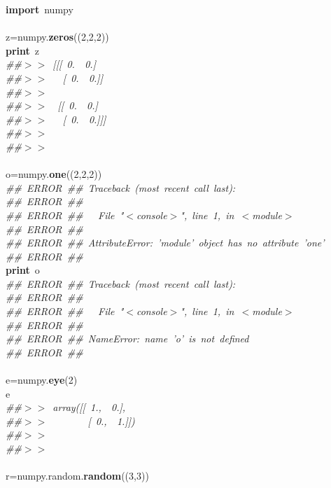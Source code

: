 \noindent
\mbox{}\textbf{import}\ numpy \\
\mbox{} \\
\mbox{}z=numpy.\textbf{zeros}((2,2,2)) \\
\mbox{}\textbf{print}\ z \\
\mbox{}\textit{\#\#$>$$>$\ [[[\ 0.\ \ 0.]} \\
\mbox{}\textit{\#\#$>$$>$\ \ \ [\ 0.\ \ 0.]]} \\
\mbox{}\textit{\#\#$>$$>$\ } \\
\mbox{}\textit{\#\#$>$$>$\ \ [[\ 0.\ \ 0.]} \\
\mbox{}\textit{\#\#$>$$>$\ \ \ [\ 0.\ \ 0.]]]} \\
\mbox{}\textit{\#\#$>$$>$\ } \\
\mbox{}\textit{\#\#$>$$>$\ } \\
\mbox{} \\
\mbox{}o=numpy.\textbf{one}((2,2,2)) \\
\mbox{}\textit{\#\#\ ERROR\ \#\#\ Traceback\ (most\ recent\ call\ last):} \\
\mbox{}\textit{\#\#\ ERROR\ \#\#\ } \\
\mbox{}\textit{\#\#\ ERROR\ \#\#\ \ \ File\ "{}$<$console$>$"{},\ line\ 1,\ in\ $<$module$>$} \\
\mbox{}\textit{\#\#\ ERROR\ \#\#\ } \\
\mbox{}\textit{\#\#\ ERROR\ \#\#\ AttributeError:\ 'module'\ object\ has\ no\ attribute\ 'one'} \\
\mbox{}\textit{\#\#\ ERROR\ \#\#\ } \\
\mbox{}\textbf{print}\ o \\
\mbox{}\textit{\#\#\ ERROR\ \#\#\ Traceback\ (most\ recent\ call\ last):} \\
\mbox{}\textit{\#\#\ ERROR\ \#\#\ } \\
\mbox{}\textit{\#\#\ ERROR\ \#\#\ \ \ File\ "{}$<$console$>$"{},\ line\ 1,\ in\ $<$module$>$} \\
\mbox{}\textit{\#\#\ ERROR\ \#\#\ } \\
\mbox{}\textit{\#\#\ ERROR\ \#\#\ NameError:\ name\ 'o'\ is\ not\ defined} \\
\mbox{}\textit{\#\#\ ERROR\ \#\#\ } \\
\mbox{} \\
\mbox{}e=numpy.\textbf{eye}(2) \\
\mbox{}e \\
\mbox{}\textit{\#\#$>$$>$\ array([[\ 1.,\ \ 0.],} \\
\mbox{}\textit{\#\#$>$$>$\ \ \ \ \ \ \ \ [\ 0.,\ \ 1.]])} \\
\mbox{}\textit{\#\#$>$$>$\ } \\
\mbox{}\textit{\#\#$>$$>$\ } \\
\mbox{} \\
\mbox{}r=numpy.random.\textbf{random}((3,3)) \\
\mbox{} \\
\mbox{}